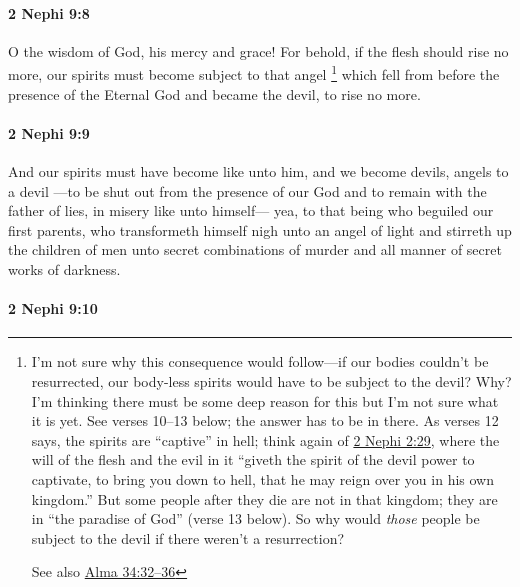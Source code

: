 		\paragraph{2 Nephi 9:8} %
			\label{2NEPHI-9-8}

			O the wisdom of God, his mercy and grace!
			For behold, if the flesh should rise no more,
			our spirits must become subject to that angel%
			\footnote{%
				\label{2NEPHI-9-8-subject}%
				I'm not sure why this consequence would follow---if our bodies couldn't be resurrected, our body-less spirits would have to be subject to the devil? Why? I'm thinking there must be some deep reason for this but I'm not sure what it is yet. See verses 10--13 below; the answer has to be in there. As verses 12 says, the spirits are ``captive'' in hell; think again of \hyperref[2NEPHI-2-29]{2 Nephi 2:29}, where the will of the flesh and the evil in it ``giveth the spirit of the devil power to captivate, to bring you down to hell, that he may reign over you in his own kingdom.'' But some people after they die are not in that kingdom; they are in ``the paradise of God'' (verse 13 below). So why would \textit{those} people be subject to the devil if there weren't a resurrection?
				
				See also \hyperref[ALMA-34-32]{Alma 34:32--36}
				} 
			which fell from before the presence of the Eternal God
			and became the devil,
			to rise no more.

		\paragraph{2 Nephi 9:9} %
			\label{2NEPHI-9-9}

			And our spirits must have become like unto him,
			and we become devils, angels to a devil
			---to be shut out from the presence of our God
			and to remain with the father of lies,
			in misery like unto himself---
			yea, to that being who beguiled our first parents,
			who transformeth himself nigh unto an angel of light
			and stirreth up the children of men unto secret combinations of murder
			and all manner of secret works of darkness.

		\paragraph{2 Nephi 9:10} %
			\label{2NEPHI-9-10}

